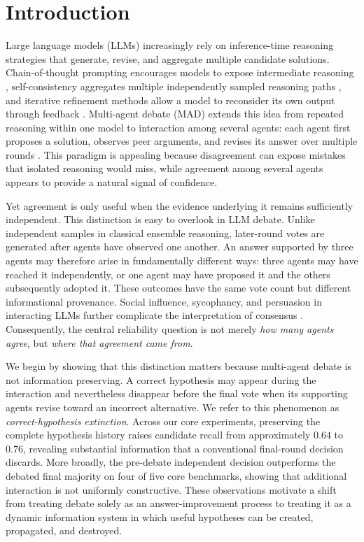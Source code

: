 \section{Introduction}
\label{sec:introduction}

Large language models (LLMs) increasingly rely on inference-time reasoning strategies that generate, revise, and aggregate multiple candidate solutions. Chain-of-thought prompting encourages models to expose intermediate reasoning \cite{wei2022cot}, self-consistency aggregates multiple independently sampled reasoning paths \cite{wang2023selfconsistency}, and iterative refinement methods allow a model to reconsider its own output through feedback \cite{madaan2023selfrefine,shinn2023reflexion}. Multi-agent debate (MAD) extends this idea from repeated reasoning within one model to interaction among several agents: each agent first proposes a solution, observes peer arguments, and revises its answer over multiple rounds \cite{du2023multiagent,liang2024debate,chen2024reconcile}. This paradigm is appealing because disagreement can expose mistakes that isolated reasoning would miss, while agreement among several agents appears to provide a natural signal of confidence.

Yet agreement is only useful when the evidence underlying it remains sufficiently independent. This distinction is easy to overlook in LLM debate. Unlike independent samples in classical ensemble reasoning, later-round votes are generated after agents have observed one another. An answer supported by three agents may therefore arise in fundamentally different ways: three agents may have reached it independently, or one agent may have proposed it and the others subsequently adopted it. These outcomes have the same vote count but different informational provenance. Social influence, sycophancy, and persuasion in interacting LLMs further complicate the interpretation of consensus \cite{zhang2024collaboration,sharma2024sycophancy,smit2024mad}. Consequently, the central reliability question is not merely \emph{how many agents agree}, but \emph{where that agreement came from}.

We begin by showing that this distinction matters because multi-agent debate is not information preserving. A correct hypothesis may appear during the interaction and nevertheless disappear before the final vote when its supporting agents revise toward an incorrect alternative. We refer to this phenomenon as \emph{correct-hypothesis extinction}. Across our core experiments, preserving the complete hypothesis history raises candidate recall from approximately $0.64$ to $0.76$, revealing substantial information that a conventional final-round decision discards. More broadly, the pre-debate independent decision outperforms the debated final majority on four of five core benchmarks, showing that additional interaction is not uniformly constructive. These observations motivate a shift from treating debate solely as an answer-improvement process to treating it as a dynamic information system in which useful hypotheses can be created, propagated, and destroyed.

